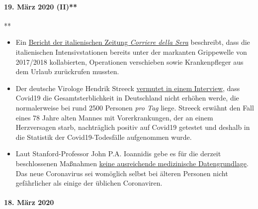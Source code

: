 \hypertarget{19-muxe4rz-2020-ii}{%
\paragraph{19. März 2020 (II)**}\label{19-muxe4rz-2020-ii}}

**

\begin{itemize}
\tightlist
\item
  Ein
  \href{https://milano.corriere.it/notizie/cronaca/18_gennaio_10/milano-terapie-intensive-collasso-l-influenza-gia-48-malati-gravi-molte-operazioni-rinviate-c9dc43a6-f5d1-11e7-9b06-fe054c3be5b2.shtml}{Bericht
  der italienischen Zeitung \emph{Corriere della Sera}} beschreibt, dass
  die italienischen Intensivstationen bereits unter der markanten
  Grippewelle von 2017/2018 kollabierten, Operationen verschieben sowie
  Krankenpfleger aus dem Urlaub zurückrufen mussten.
\item
  Der deutsche Virologe Hendrik Streeck
  \href{https://www.faz.net/aktuell/gesellschaft/gesundheit/coronavirus/virologe-hendrik-streeck-ueber-corona-neue-symptome-entdeckt-16681450.html?printPagedArticle=true\#pageIndex_2}{vermutet
  in einem Interview}, dass Covid19 die Gesamtsterblichkeit in
  Deutschland nicht erhöhen werde, die normalerweise bei rund 2500
  Personen \emph{pro Tag} liege. Streeck erwähnt den Fall eines 78 Jahre
  alten Mannes mit Vorerkrankungen, der an einem Herzversagen starb,
  nachträglich positiv auf Covid19 getestet und deshalb in die Statistik
  der Covid19-Todesfälle aufgenommen wurde.
\item
  Laut Stanford-Professor John P.A. Ioannidis gebe es für die derzeit
  beschlossenen Maßnahmen
  \href{https://www.statnews.com/2020/03/17/a-fiasco-in-the-making-as-the-coronavirus-pandemic-takes-hold-we-are-making-decisions-without-reliable-data/}{keine
  ausreichende medizinische Datengrundlage}. Das neue Coronavirus sei
  womöglich selbst bei älteren Personen nicht gefährlicher als einige
  der üblichen Coronaviren.
\end{itemize}

\hypertarget{18-muxe4rz-2020}{%
\paragraph{18. März 2020}\label{18-muxe4rz-2020}}

